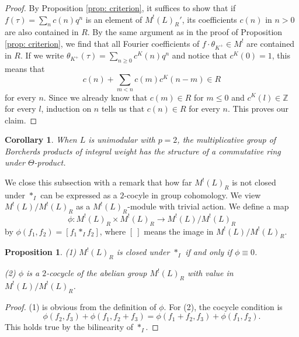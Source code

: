 \documentclass[12pt]{amsart}
\numberwithin{equation}{section}
\newtheorem{proposition}[theorem]{Proposition}
\newtheorem{corollary}[theorem]{Corollary}
\theoremstyle{definition}
\theoremstyle{remark}
\newcommand{\Z}{\mathbb{Z}}
\newcommand{\ML}{M^{!}(L)}
\newcommand{\MLR}{M^{!}(L)_{R}}
\begin{document}
\begin{proof}
By Proposition \ref{prop: criterion},  
it suffices to show that if $f(\tau)=\sum_{n}c(n)q^{n}$ is an element of $M^{!}(L)_{R}'$, 
its coefficients $c(n)$ in $n>0$ are also contained in $R$. 
By the same argument as in the proof of Proposition \ref{prop: criterion}, 
we find that 
all Fourier coefficients of $f\cdot \theta_{K^{+}}\in M^!$ are contained in $R$. 
If we write 
$\theta_{K^{+}}(\tau)=\sum_{n\geq 0}c^{K}(n)q^{n}$ and notice that $c^{K}(0)=1$, 
this means that 
\begin{equation*}
c(n)+\sum_{m<n}c(m)c^{K}(n-m)\in R 
\end{equation*}
for every $n$. 
Since we already know that 
$c(m)\in R$ for $m\leq 0$ 
and $c^{K}(l)\in {\Z}$ for every $l$, 
induction on $n$ tells us that 
$c(n)\in R$ for every $n$. 
This proves our claim. 
\end{proof} 


\begin{corollary}
When $L$ is unimodular with $p=2$, 
the multiplicative group of Borcherds products of integral weight 
has the structure of a commutative ring under $\Theta$-product. 
\end{corollary}


We close this subsection with a remark that 
how far ${\MLR}$ is not closed under $\ast_{I}$ can be 
expressed as a $2$-cocyle in group cohomology. 
We view ${\ML}/{\MLR}$ as a ${\MLR}$-module with trivial action. 
We define a map 
\begin{equation*}
\phi : {\MLR}\times {\MLR} \to {\ML}/{\MLR} 
\end{equation*}
by 
$\phi(f_{1}, f_{2})=[f_{1}\ast_{I}f_{2}]$, 
where $[ \: ]$ means the image in ${\ML}/{\MLR}$. 

\begin{proposition}
(1) ${\MLR}$ is closed under $\ast_{I}$ if and only if $\phi\equiv 0$. 

(2) $\phi$ is a $2$-cocycle of the abelian group ${\MLR}$ with value in ${\ML}/{\MLR}$. 
\end{proposition}

\begin{proof}
(1) is obvious from the definition of $\phi$. 
For (2), the cocycle condition is 
\begin{equation*}
\phi(f_{2}, f_{3}) + \phi(f_{1}, f_{2}+f_{3}) = 
\phi(f_{1}+f_{2}, f_{3}) + \phi(f_{1}, f_{2}). 
\end{equation*}
This holds true by the bilinearity of $\ast_{I}$. 
\end{proof}
\end{document}
